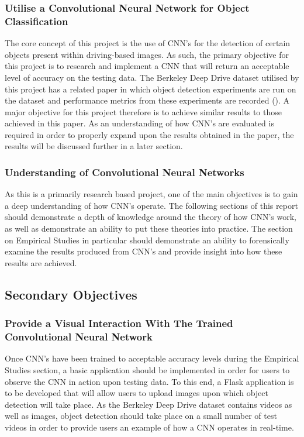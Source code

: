 \documentclass[12pt]{report}
\begin{document}
\subsubsection{Utilise a Convolutional Neural Network for Object Classification}
The core concept of this project is the use of CNN's for the detection of certain objects present within driving-based images. As such, the primary objective for this project is to research and implement a CNN that will return an acceptable level of accuracy on the testing data. The Berkeley Deep Drive dataset utilised by this project has a related paper in which object detection experiments are run on the dataset and performance metrics from these experiments are recorded (\cite{yu2018bdd100k}). A major objective for this project therefore is to achieve similar results to those achieved in this paper. As an understanding of how CNN's are evaluated is required in order to properly expand upon the results obtained in the paper, the results will be discussed further in a later section.
\subsubsection{Understanding of Convolutional Neural Networks}
As this is a primarily research based project, one of the main objectives is to gain a deep understanding of how CNN's operate. The following sections of this report should demonstrate a depth of knowledge around the theory of how CNN's work, as well as demonstrate an ability to put these theories into practice. The section on Empirical Studies in particular should demonstrate an ability to forensically examine the results produced from CNN's and provide insight into how these results are achieved.
\vspace{0.5cm}
\subsection{Secondary Objectives}
\subsubsection{Provide a Visual Interaction With The Trained Convolutional Neural Network}
\begin{flushleft}
Once CNN's have been trained to acceptable accuracy levels during the Empirical Studies section, a basic application should be implemented in order for users to observe the CNN in action upon testing data. To this end, a Flask application is to be developed that will allow users to upload images upon which object detection will take place. As the Berkeley Deep Drive dataset contains videos as well as images, object detection should take place on a small number of test videos in order to provide users an example of how a CNN operates in real-time.
\end{flushleft}
\end{document}
